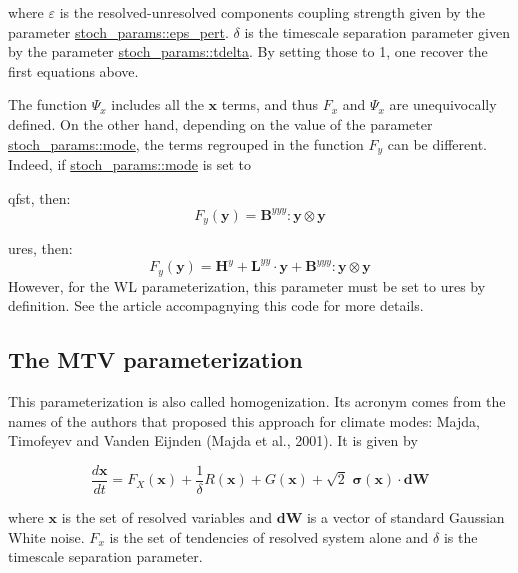 where $\varepsilon$ is the resolved-\/unresolved components coupling strength given by the parameter \hyperlink{namespacestoch__params_aa0504e89179fe42b3f3206811f1592dc}{stoch\+\_\+params\+::eps\+\_\+pert}. $\delta$ is the timescale separation parameter given by the parameter \hyperlink{namespacestoch__params_a3995bce17d12b533df6b86ab0072b7c3}{stoch\+\_\+params\+::tdelta}. By setting those to 1, one recover the first equations above.

The function $\Psi_x$ includes all the $\boldsymbol x$ terms, and thus $F_x$ and $\Psi_x$ are unequivocally defined. On the other hand, depending on the value of the parameter \hyperlink{namespacestoch__params_a2c3f6439fd2d66413d065b533f2a6263}{stoch\+\_\+params\+::mode}, the terms regrouped in the function $F_y$ can be different. Indeed, if \hyperlink{namespacestoch__params_a2c3f6439fd2d66413d065b533f2a6263}{stoch\+\_\+params\+::mode} is set to
\begin{DoxyItemize}
\item \textquotesingle{}qfst\textquotesingle{}, then\+: \[ F_y(\boldsymbol{y})= \boldsymbol{B}^{yyy} : \boldsymbol{y} \otimes \boldsymbol{y} \]
\item \textquotesingle{}ures\textquotesingle{}, then\+: \[ F_y(\boldsymbol{y})= \boldsymbol{H}^y + \boldsymbol{L}^{yy}\cdot\boldsymbol{y} + \boldsymbol{B}^{yyy} : \boldsymbol{y} \otimes \boldsymbol{y} \] However, for the WL parameterization, this parameter must be set to \textquotesingle{}ures\textquotesingle{} by definition. See the article accompagnying this code for more details. 


\end{DoxyItemize}

\subsection*{The M\+TV parameterization}

This parameterization is also called homogenization. Its acronym comes from the names of the authors that proposed this approach for climate modes\+: Majda, Timofeyev and Vanden Eijnden (Majda et al., 2001). It is given by

\[ \frac{d\boldsymbol{x}}{dt} = F_X(\boldsymbol{x}) + \frac{1}{\delta} R(\boldsymbol{x}) + G(\boldsymbol{x}) + \sqrt{2} \,\, \boldsymbol{\sigma}(\boldsymbol{x}) \cdot \boldsymbol{dW} \]

where $\boldsymbol{x}$ is the set of resolved variables and $\boldsymbol{dW}$ is a vector of standard Gaussian White noise. $F_x$ is the set of tendencies of resolved system alone and $\delta$ is the timescale separation parameter.

